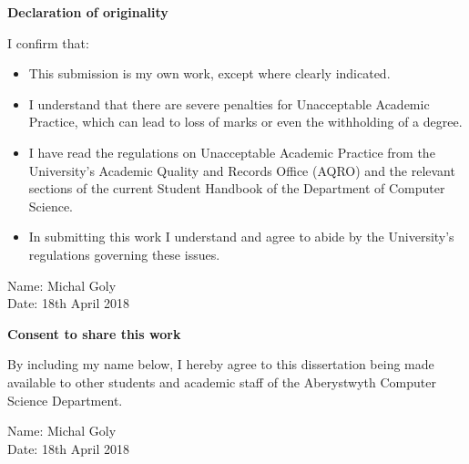 \thispagestyle{empty}

\begin{center}
    {\LARGE\bf Declaration of originality}
\end{center}

I confirm that:

\begin{itemize}
\item{This submission is my own work, except where
clearly indicated.}

\item{I understand that there are severe penalties for Unacceptable Academic Practice, which can lead to loss of marks or even the withholding of a degree.}

\item{I have read the regulations on Unacceptable Academic Practice from the University's Academic Quality and Records Office (AQRO) and the relevant sections of the current Student Handbook of the Department of Computer Science.}

\item{In submitting this work I understand and agree to abide by the University's regulations governing these issues.}
\end{itemize}

\vspace{2em}
Name: Michal Goly  \\

\vspace{1em}
Date: 18th April 2018 \\

\vspace{1em}
\begin{center}
    {\LARGE\bf Consent to share this work}
\end{center}

By including my name below, I hereby agree to this dissertation being made available to other students and academic staff of the Aberystwyth Computer Science Department.

\vspace{2em}
Name: Michal Goly  \\

\vspace{1em}
Date: 18th April 2018 \\

